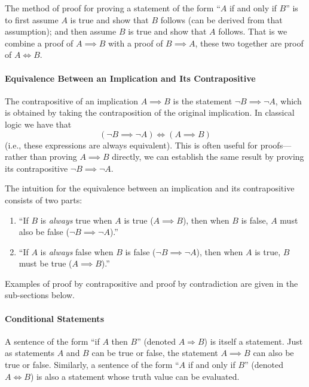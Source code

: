 \noindent The method of proof for proving a statement of the form ``$A$ if and only if $B$'' is to first assume $A$ is true and show that $B$ follows (can be derived from that assumption); and then assume $B$ is true and show that $A$ follows. That is we combine a proof of $A\implies B$ with a proof of $B \implies A$, these two together are proof of $A\iff B$.

\paragraph{Equivalence Between an Implication and Its Contrapositive}  
The contrapositive of an implication $ A \implies B $ is the statement $ \lnot B \implies \lnot A $, which is obtained by taking the contraposition of the original implication. In classical logic we have that  
\[
    (\lnot B \implies \lnot A) \iff (A\implies B)
\]  
(i.e., these expressions are always equivalent). This is often useful for proofs—rather than proving $ A\implies B $ directly, we can establish the same result by proving its contrapositive $ \lnot B \implies \lnot A $.  

The intuition for the equivalence between an implication and its contrapositive consists of two parts:  
\begin{enumerate}  
    \item ``If $ B $ is \textit{always} true when $ A $ is true ($ A\implies B $), then when $ B $ is false, $ A $ must also be false ($ \lnot B \implies \lnot A $).''  
    \item ``If $ A $ is \textit{always} false when $ B $ is false ($ \lnot B \implies \lnot A $), then when $ A $ is true, $ B $ must be true ($ A\implies B $).''  
\end{enumerate}  
Examples of proof by contrapositive and proof by contradiction are given in the sub-sections below.  

\paragraph{Conditional Statements}
A sentence of the form ``if $A$ then $B$'' (denoted $A \Rightarrow B$) is itself a statement. Just as statements $A$ and $B$ can be true or false, the statement $A \implies B$ can also be true or false. Similarly, a sentence of the form ``$A$ if and only if $B$'' (denoted $A \iff B$) is also a statement whose truth value can be evaluated. 

